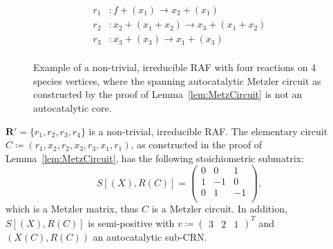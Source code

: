 \documentclass[pdflatex]{sn-jnl}
\theoremstyle{thmstyleone}%
\theoremstyle{examplesty}%
\theoremstyle{thmstylethree}%
\newcommand{\SM}{S}
\newcommand{\RAF}[0]{\mathbf{R}'}
\begin{document}
\begin{figure}[h]
  \begin{minipage}[c]{0.55\textwidth}
    \begin{equation}
      \begin{split}
	r_1&: f +(x_1) \rightarrow x_2 +(x_1) \\
	r_2&: x_2 + (x_1 + x_2) \rightarrow  x_3 + (x_1 + x_2) \\
	r_3&: x_3 + (x_3) \rightarrow x_1 + (x_3)\\
      \end{split}
    \end{equation}
  \end{minipage}%
  \hfill%
  \begin{minipage}[c]{0.45\textwidth}
    \centering
  \end{minipage}
  \caption{Example of a non-trivial, irreducible RAF with four reactions on
    4 species vertices, where the spanning autocatalytic Metzler circuit as
    constructed by the proof of Lemma~\ref{lem:MetzCircuit} is not an
    autocatalytic core.}
  \label{fig:RAFContAutCyc}
\end{figure}
\FloatBarrier

$\RAF=\{r_1,r_2,r_3,r_4\}$ is a non-trivial, irreducible RAF. The
elementary circuit $C\coloneqq (r_1, x_2,r_2,x_3,r_3,x_1,r_1)$, as
constructed in the proof of Lemma~\ref{lem:MetzCircuit}, has the following
stoichiometric submatrix:
\begin{equation}
  \SM[(X),R(C)] = \begin{pmatrix}
    0 & 0  &  1  \\
    1 & -1 &  0   \\		
    0 & 1 &  -1   \\
  \end{pmatrix},
\end{equation}
which is a Metzler matrix, thus $C$ is a Metzler circuit. In addition,
$\SM[(X),R(C)]$ is semi-positive with $v\coloneqq \begin{pmatrix} 3 & 2 &
  1 \end{pmatrix}^T$ and $(X(C),R(C))$ an autocatalytic sub-CRN.
\end{document}
